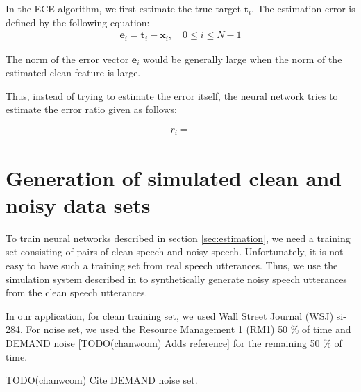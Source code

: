 \documentclass{article}
\begin{document}
In the ECE algorithm, we first estimate the true target $\boldsymbol{t}_i$. The
estimation error is defined by the following equation:
\begin{align}
  \boldsymbol{e}_i =  \boldsymbol{t}_i - \boldsymbol{x}_i, \quad 0 \le i \le N - 1
\end{align}

The norm of the error vector $\boldsymbol{e}_i$ would be generally large when
the norm of the estimated clean feature is large.

Thus, instead of trying to estimate the error itself, the neural network tries to
estimate the error ratio given as follows:

\begin{align}
  r_i = {}{}
\end{align}

\section{Generation of simulated clean and noisy data sets}
\label{gen_inst}

To train neural networks described in section \ref{sec:estimation}, we
need a training set consisting of pairs of clean speech and noisy speech.
Unfortunately, it is not easy to have such a training set from real speech
utterances. Thus, we use the simulation system described in
\cite{C_Kim_INTERSPEECH_2017_1} to synthetically generate noisy speech
utterances from the clean speech utterances.

In our application, for clean training set, we used Wall Street Journal (WSJ)
si-284. For noise set, we used the Resource Management 1 (RM1)
\cite{price_p_ldc_1993} 50 \% of time 
and DEMAND noise [TODO(chanwcom) Adds reference] for the remaining 50 \% of time.

TODO(chanwcom) Cite DEMAND noise set.





%
%
%
%
%
%
\end{document}
